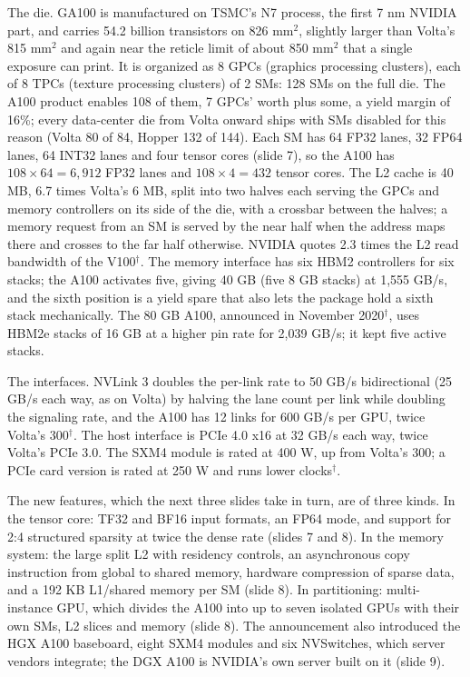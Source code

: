 \documentclass[11pt,letterpaper]{article}
\begin{document}
The die. GA100 is manufactured on TSMC's N7 process, the first 7 nm NVIDIA part, and carries 54.2 billion transistors on 826 mm$^2$, slightly larger than Volta's 815 mm$^2$ and again near the reticle limit of about 850 mm$^2$ that a single exposure can print. It is organized as 8 GPCs (graphics processing clusters), each of 8 TPCs (texture processing clusters) of 2 SMs: 128 SMs on the full die. The A100 product enables 108 of them, 7 GPCs' worth plus some, a yield margin of 16\%; every data-center die from Volta onward ships with SMs disabled for this reason (Volta 80 of 84, Hopper 132 of 144). Each SM has 64 FP32 lanes, 32 FP64 lanes, 64 INT32 lanes and four tensor cores (slide 7), so the A100 has $108 \times 64 = 6{,}912$ FP32 lanes and $108 \times 4 = 432$ tensor cores. The L2 cache is 40 MB, 6.7 times Volta's 6 MB, split into two halves each serving the GPCs and memory controllers on its side of the die, with a crossbar between the halves; a memory request from an SM is served by the near half when the address maps there and crosses to the far half otherwise. NVIDIA quotes 2.3 times the L2 read bandwidth of the V100$^\dagger$. The memory interface has six HBM2 controllers for six stacks; the A100 activates five, giving 40 GB (five 8 GB stacks) at 1,555 GB/s, and the sixth position is a yield spare that also lets the package hold a sixth stack mechanically. The 80 GB A100, announced in November 2020$^\dagger$, uses HBM2e stacks of 16 GB at a higher pin rate for 2,039 GB/s; it kept five active stacks.

The interfaces. NVLink 3 doubles the per-link rate to 50 GB/s bidirectional (25 GB/s each way, as on Volta) by halving the lane count per link while doubling the signaling rate, and the A100 has 12 links for 600 GB/s per GPU, twice Volta's 300$^\dagger$. The host interface is PCIe 4.0 x16 at 32 GB/s each way, twice Volta's PCIe 3.0. The SXM4 module is rated at 400 W, up from Volta's 300; a PCIe card version is rated at 250 W and runs lower clocks$^\dagger$.

The new features, which the next three slides take in turn, are of three kinds. In the tensor core: TF32 and BF16 input formats, an FP64 mode, and support for 2:4 structured sparsity at twice the dense rate (slides 7 and 8). In the memory system: the large split L2 with residency controls, an asynchronous copy instruction from global to shared memory, hardware compression of sparse data, and a 192 KB L1/shared memory per SM (slide 8). In partitioning: multi-instance GPU, which divides the A100 into up to seven isolated GPUs with their own SMs, L2 slices and memory (slide 8). The announcement also introduced the HGX A100 baseboard, eight SXM4 modules and six NVSwitches, which server vendors integrate; the DGX A100 is NVIDIA's own server built on it (slide 9).
\end{document}
